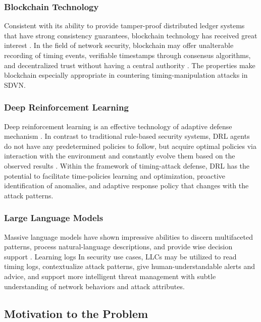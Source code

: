 \subsubsection{Blockchain Technology}

Consistent with its ability to provide tamper-proof distributed ledger systems that have strong consistency guarantees, blockchain technology has received great interest \cite{Mozumder2020Blockchain}. In the field of network security, blockchain may offer unalterable recording of timing events, verifiable timestamps through consensus algorithms, and decentralized trust without having a central authority \cite{Derhab2021BMC}. The properties make blockchain especially appropriate in countering timing-manipulation attacks in SDVN.

\subsubsection{Deep Reinforcement Learning}

Deep reinforcement learning is an effective technology of adaptive defense mechanism \cite{Kanimozhi2022DRL}. In contrast to traditional rule-based security systems, DRL agents do not have any predetermined policies to follow, but acquire optimal policies via interaction with the environment and constantly evolve them based on the observed results \cite{rischke2020qrsdn, chen2022rlmr}. Within the framework of timing-attack defense, DRL has the potential to facilitate time-policies learning and optimization, proactive identification of anomalies, and adaptive response policy that changes with the attack patterns.

\subsubsection{Large Language Models}

Massive language models have shown impressive abilities to discern multifaceted patterns, process natural-language descriptions, and provide wise decision support \cite{Zhang2024LLM}. Learning logs In security use cases, LLCs may be utilized to read timing logs, contextualize attack patterns, give human-understandable alerts and advice, and support more intelligent threat management with subtle understanding of network behaviors and attack attributes.

\subsection{Motivation to the Problem}


